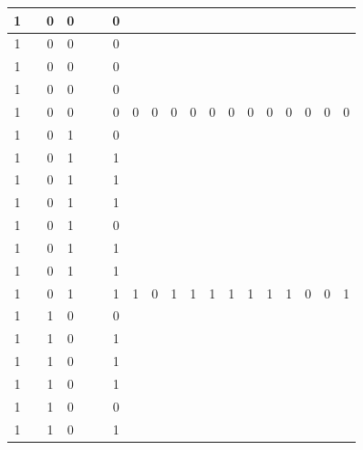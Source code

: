 \begin{table}[!tb]
\begin{tabular}{|c|c|c|c|c|c|c|c|c|c|c|c|c|c|c|c|c|c|c|}
        \rowcolor{yellow!40} 1 &  & 0 & 0 &  &  & 0 &  &  &  &  &  &  &  &  &  &  &  &  \\ \hline
        \rowcolor{yellow!40} 1 &  & 0 & 0 &  &  & 0 &  &  &  &  &  &  &  &  &  &  &  &  \\ \hline
        \rowcolor{yellow!40} 1 &  & 0 & 0 &  &  & 0 &  &  &  &  &  &  &  &  &  &  &  &  \\ \hline
        \rowcolor{yellow!40} 1 &  & 0 & 0 &  &  & 0 &  &  &  &  &  &  &  &  &  &  &  &  \\ \hline
        \rowcolor{yellow!40} 1 &  & 0 & 0 &  &  & 0 & 0 & 0 & 0 & 0 & 0 & 0 & 0 & 0 & 0 & 0 & 0 & 0 \\ \hline
        \rowcolor{gray!40} 1 &  & 0 & 1 &  &  & 0 &  &  &  &  &  &  &  &  &  &  &  &  \\ \hline
        \rowcolor{gray!40} 1 &  & 0 & 1 &  &  & 1 &  &  &  &  &  &  &  &  &  &  &  &  \\ \hline
        \rowcolor{gray!40} 1 &  & 0 & 1 &  &  & 1 &  &  &  &  &  &  &  &  &  &  &  &  \\ \hline
        \rowcolor{gray!40} 1 &  & 0 & 1 &  &  & 1 &  &  &  &  &  &  &  &  &  &  &  &  \\ \hline
        \rowcolor{gray!40} 1 &  & 0 & 1 &  &  & 0 &  &  &  &  &  &  &  &  &  &  &  &  \\ \hline
        \rowcolor{gray!40} 1 &  & 0 & 1 &  &  & 1 &  &  &  &  &  &  &  &  &  &  &  &  \\ \hline
        \rowcolor{gray!40} 1 &  & 0 & 1 &  &  & 1 &  &  &  &  &  &  &  &  &  &  &  &  \\ \hline
        \rowcolor{gray!40} 1 &  & 0 & 1 &  &  & 1 & 1 & 0 & 1 & 1 & 1 & 1 & 1 & 1 & 1 & 0 & 0 & 1 \\ \hline
        \rowcolor{blue!40} 1 &  & 1 & 0 &  &  & 0 &  &  &  &  &  &  &  &  &  &  &  &  \\ \hline
        \rowcolor{blue!40} 1 &  & 1 & 0 &  &  & 1 &  &  &  &  &  &  &  &  &  &  &  &  \\ \hline
        \rowcolor{blue!40} 1 &  & 1 & 0 &  &  & 1 &  &  &  &  &  &  &  &  &  &  &  &  \\ \hline
        \rowcolor{blue!40} 1 &  & 1 & 0 &  &  & 1 &  &  &  &  &  &  &  &  &  &  &  &  \\ \hline
        \rowcolor{blue!40} 1 &  & 1 & 0 &  &  & 0 &  &  &  &  &  &  &  &  &  &  &  &  \\ \hline
        \rowcolor{blue!40} 1 &  & 1 & 0 &  &  & 1 &  &  &  &  &  &  &  &  &  &  &  &  \\ \hline

\end{tabular}
\end{table}
